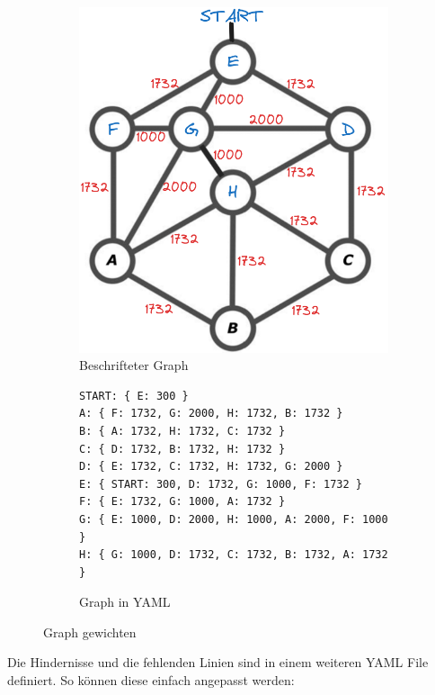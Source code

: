 \begin{figure}[H]
\centering
\begin{subfigure}{0.37\textwidth}
\centering
\includegraphics[width=0.95\linewidth]{img/graph_with_weighted_edges_1.png} 
\caption{Beschrifteter Graph}
\label{fig:labeled-graph}
\end{subfigure}
\begin{subfigure}{0.6\textwidth}
\begin{footnotesize}
\begin{verbatim}
START: { E: 300 }
A: { F: 1732, G: 2000, H: 1732, B: 1732 }
B: { A: 1732, H: 1732, C: 1732 }
C: { D: 1732, B: 1732, H: 1732 }
D: { E: 1732, C: 1732, H: 1732, G: 2000 }
E: { START: 300, D: 1732, G: 1000, F: 1732 }
F: { E: 1732, G: 1000, A: 1732 }
G: { E: 1000, D: 2000, H: 1000, A: 2000, F: 1000 }
H: { G: 1000, D: 1732, C: 1732, B: 1732, A: 1732 }
\end{verbatim}
\end{footnotesize}
\caption{Graph in YAML}
\label{fig:graph-yaml}
\end{subfigure}
\caption{Graph gewichten}
\label{fig:labeled-graph-and-yaml}
\end{figure}

Die Hindernisse und die fehlenden Linien sind in einem weiteren YAML File definiert. So können diese einfach angepasst werden:

